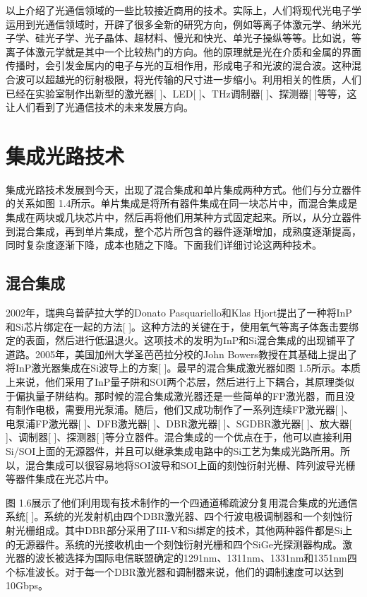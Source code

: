 \documentclass[oneside]{ZJUthesis}
\begin{document}
以上介绍了光通信领域的一些比较接近商用的技术。实际上，人们将现代光电子学运用到光通信领域时，开辟了很多全新的研究方向，例如等离子体激元学、纳米光子学、硅光子学、光子晶体、超材料、慢光和快光、单光子操纵等等。比如说，等离子体激元学就是其中一个比较热门的方向。他的原理就是光在介质和金属的界面传播时，会引发金属内的电子与光的互相作用，形成电子和光波的混合波。这种混合波可以超越光的衍射极限，将光传输的尺寸进一步缩小。利用相关的性质，人们已经在实验室制作出新型的激光器[ ]、LED[ ]、THz调制器[ ]、探测器[ ]等等，这让人们看到了光通信技术的未来发展方向。
\section{集成光路技术}

集成光路技术发展到今天，出现了混合集成和单片集成两种方式。他们与分立器件的关系如图 1.4所示。单片集成是将所有器件集成在同一块芯片中，而混合集成是集成在两块或几块芯片中，然后再将他们用某种方式固定起来。所以，从分立器件到混合集成，再到单片集成，整个芯片所包含的器件逐渐增加，成熟度逐渐提高，同时复杂度逐渐下降，成本也随之下降。下面我们详细讨论这两种技术。

\subsection{混合集成}

2002年，瑞典乌普萨拉大学的Donato Pasquariello和Klas Hjort提出了一种将InP和Si芯片绑定在一起的方法[ ]。这种方法的关键在于，使用氧气等离子体轰击要绑定的表面，然后进行低温退火。这项技术的发明为InP和Si混合集成的出现铺平了道路。2005年，美国加州大学圣芭芭拉分校的John Bowers教授在其基础上提出了将InP激光器集成在Si波导上的方案[ ]。最早的混合集成激光器如图 1.5所示。本质上来说，他们采用了InP量子阱和SOI两个芯层，然后进行上下耦合，其原理类似于偏执量子阱结构。那时候的混合集成激光器还是一些简单的FP激光器，而且没有制作电极，需要用光泵浦。随后，他们又成功制作了一系列连续FP激光器[ ]、电泵浦FP激光器[ ]、DFB激光器[ ]、DBR激光器[ ]、SGDBR激光器[ ]、放大器[ ]、调制器[ ]、探测器[ ]等分立器件。混合集成的一个优点在于，他可以直接利用Si/SOI上面的无源器件，并且可以继承集成电路中的Si工艺为集成光路所用。所以，混合集成可以很容易地将SOI波导和SOI上面的刻蚀衍射光栅、阵列波导光栅等器件集成在光芯片中。

图 1.6展示了他们利用现有技术制作的一个四通道稀疏波分复用混合集成的光通信系统[ ]。系统的光发射机由四个DBR激光器、四个行波电极调制器和一个刻蚀衍射光栅组成。其中DBR部分采用了III-V和Si绑定的技术，其他两种器件都是Si上的无源器件。系统的光接收机由一个刻蚀衍射光栅和四个SiGe光探测器构成。激光器的波长被选择为国际电信联盟确定的1291nm、1311nm、1331nm和1351nm四个标准波长。对于每一个DBR激光器和调制器来说，他们的调制速度可以达到10Gbps。
\end{document}
